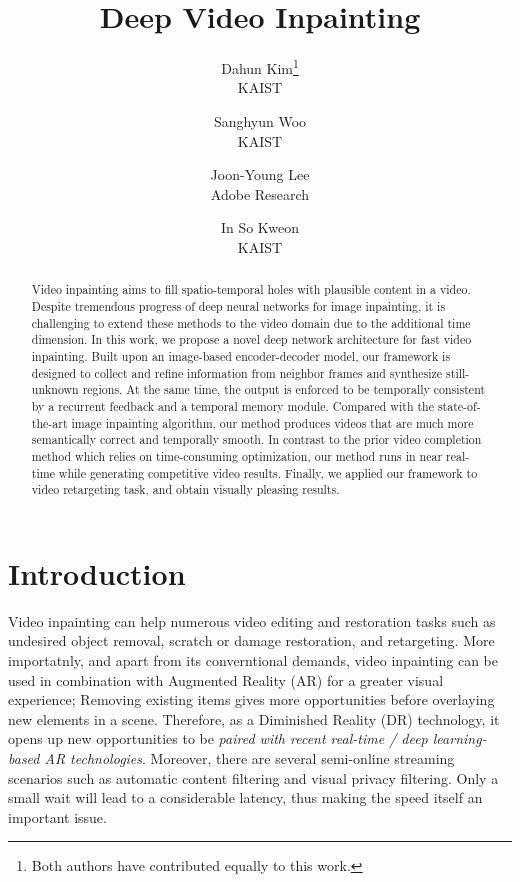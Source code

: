 \documentclass[10pt,twocolumn,letterpaper]{article}
\begin{document}
\title{Deep Video Inpainting}

\author{Dahun Kim\thanks{Both authors have contributed equally to this work.}\\
KAIST\\
\and
Sanghyun Woo\footnotemark[1]\\
KAIST\\
\and
Joon-Young Lee\\
Adobe Research\\
\and
In So Kweon\\
KAIST\\
}

\maketitle


\begin{abstract}
Video inpainting aims to fill spatio-temporal holes with plausible content in a video. Despite tremendous progress of deep neural networks for image inpainting, it is challenging to extend these methods to the video domain due to the additional time dimension. In this work, we propose a novel deep network architecture for fast video inpainting. Built upon an image-based encoder-decoder model, our framework is designed to collect and refine information from neighbor frames and synthesize still-unknown regions. At the same time, the output is enforced to be temporally consistent by a recurrent feedback and a temporal memory module. Compared with the state-of-the-art image inpainting algorithm, our method produces videos that are much more semantically correct and temporally smooth. In contrast to the prior video completion method which relies on time-consuming optimization, our method runs in near real-time while generating competitive video results. Finally, we applied our framework to video retargeting task, and obtain visually pleasing results.
\end{abstract}

\section{Introduction}

Video inpainting can help numerous video editing and restoration tasks such as undesired object removal, scratch or damage restoration, and retargeting. More importatnly, and apart from its converntional demands, video inpainting can be used in combination with Augmented Reality (AR) for a greater visual experience; Removing existing items gives more opportunities before overlaying new elements in a scene. Therefore, as a Diminished Reality (DR) technology, it opens up new opportunities to be \textit{paired with recent real-time / deep learning-based AR technologies}. Moreover, there are several semi-online streaming scenarios such as automatic content filtering and visual privacy filtering. Only a small wait will lead to a considerable latency, thus making the speed itself an important issue.
\end{document}
